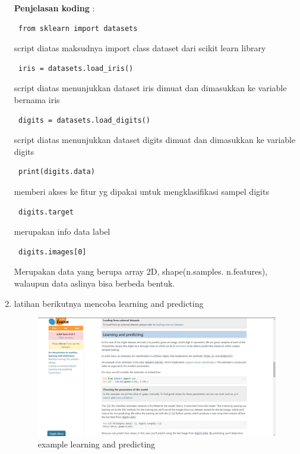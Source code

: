 \begin{enumerate}
		\textbf{Penjelasan koding} :
		
		
		\begin{verbatim} from sklearn import datasets \end{verbatim} script diatas maksudnya import class dataset dari scikit learn library
		
		\begin{verbatim} iris = datasets.load_iris() \end{verbatim} script diatas menunjukkan dataset iris dimuat dan dimasukkan  ke variable bernama iris
		
		\begin{verbatim} digits = datasets.load_digits() \end{verbatim} script diatas menunjukkan  dataset digits dimuat dan dimasukkan ke variable digits
		
		\begin{verbatim} print(digits.data) \end{verbatim} memberi akses ke fitur yg dipakai untuk mengklasifikasi sampel digits 
		
		\begin{verbatim} digits.target  \end{verbatim} merupakan info data label
		
		\begin{verbatim} digits.images[0]  \end{verbatim} Merupakan data yang berupa array 2D, shape(n.samples. n.features), walaupun data aslinya bisa berbeda bentuk.
		
		\item{latihan berikutnya mencoba learning and predicting}
        \begin{figure}[H]
		\centering
		\includegraphics[width=1\textwidth]{figures/1184095/chapter1/7awal.JPG}
		\caption{example learning and predicting}
		\label{print}
		\end{figure}
		

\end{enumerate}
